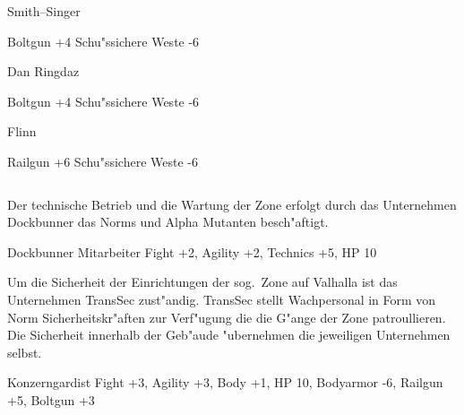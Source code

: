 \begin{column}[r]{0.45}
    \begin{nscsheet}[h]{Smith--Singer}
        \nscstats[ATT=7,AGG=7,EMP=7,KNO=5,HP=12]
        \nscruler
        \begin{nscinventory}
            \nscitem[Waffen] Boltgun +4
            \nscitem[R"ustung] Schu"ssichere Weste -6           
        \end{nscinventory}
    \end{nscsheet}

    \begin{nscsheet}[h]{Dan Ringdaz}
        \nscstats[ATT=4,AGG=4,EMP=4,KNO=5,HP=10]
        \nscruler
        \begin{nscinventory}
            \nscitem[Waffen] Boltgun +4
            \nscitem[R"ustung] Schu"ssichere Weste -6           
        \end{nscinventory}
    \end{nscsheet}

    \begin{nscsheet}[h]{Flinn}
        \nscstats[ATT=6,AGG=5,EMP=2,KNO=4,HP=12]
        \nscruler
        \begin{nscinventory}
            \nscitem[Waffen] Railgun +6
            \nscitem[R"ustung] Schu"ssichere Weste -6           
        \end{nscinventory}
    \end{nscsheet}
\end{column}



Der technische Betrieb und die Wartung der Zone erfolgt durch das Unternehmen Dockbunner das Norms und Alpha Mutanten 
besch"aftigt.

Dockbunner Mitarbeiter Fight +2, Agility +2, Technics +5, HP 10


Um die Sicherheit der Einrichtungen der sog.~Zone auf Valhalla ist das Unternehmen TransSec zust"andig. TransSec stellt
Wachpersonal in Form von Norm Sicherheitskr"aften zur Verf"ugung die die G"ange der Zone patroullieren. Die Sicherheit
innerhalb der Geb"aude "ubernehmen die jeweiligen Unternehmen selbst.

Konzerngardist Fight +3, Agility +3, Body +1, HP 10, Bodyarmor -6, Railgun +5, Boltgun +3


